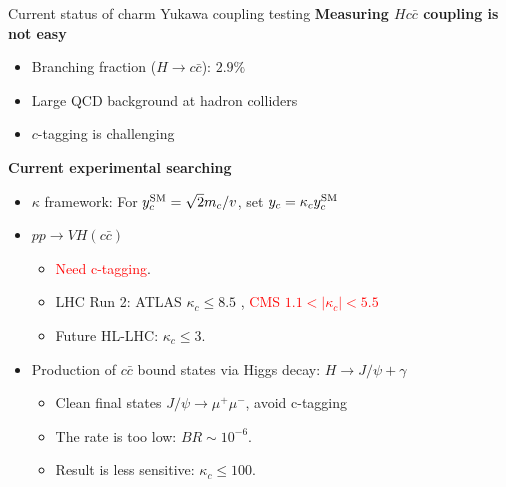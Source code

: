 \documentclass[aspectratio=169]{beamer}
\begin{document}
\begin{frame}{Current status of charm Yukawa coupling testing}
	\hspace{3mm}\textcolor{PittRoyal}{\bf Measuring $Hc{\bar c}$ coupling is not easy}
\begin{itemize}
	\item Branching fraction ($H \to c {\bar c}$): $2.9\%$
	\item Large QCD background at hadron colliders
	\item $c$-tagging is challenging
\end{itemize}

\vspace{2mm}
\hspace{3mm}\textcolor{PittRoyal}{\bf Current experimental searching}
\begin{itemize}
	\item $\kappa$ framework: For $y_c^{\rm SM} = \sqrt{2}m_c/v$, set $y_c=\kappa_c y_c^{\rm SM}$
	\item $pp\to VH (c{\bar c}) $
	\begin{itemize}
		\item \textcolor{red}{Need c-tagging}.
		\item LHC Run 2: ATLAS $\kappa_c \leq 8.5$ , \textcolor{red}{CMS $1.1< |\kappa_c| < 5.5$}   
		\item Future HL-LHC: $\kappa_c \leq 3$. 
	\end{itemize}
	\item Production of $c{\bar c}$ bound states via Higgs decay: $H\to J/\psi +\gamma$
	\begin{itemize}
		\item Clean final states $J/\psi \to \mu^+ \mu^-$, avoid c-tagging
		\item The rate is too low: $BR\sim 10^{-6}$. 
		\item Result is less sensitive: $\kappa_c \leq 100$. 
	\end{itemize}
\end{itemize}
\end{frame}
\end{document}
